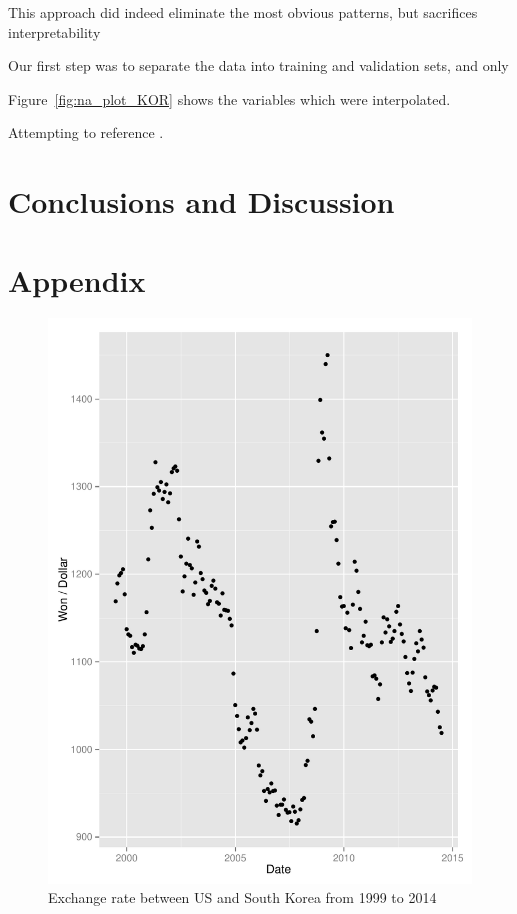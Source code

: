 \documentclass[12pt]{article}
\begin{document}
This approach did indeed eliminate the most obvious patterns, but 
sacrifices interpretability 

Our first step was to separate the data into training and validation sets,
and only 

Figure~\ref{fig:na_plot_KOR} shows the variables which were interpolated.

Attempting to reference \cite{lamport94}.

\section{Conclusions and Discussion}


\newpage
\section{Appendix}

\listoffigures

\begin{figure}
  \centering
    \includegraphics{exchange_rate.pdf}
  \caption{Exchange rate between US and South Korea from 1999 to 2014}
  \label{fig:exchange_rate}
\end{figure}
\end{document}
